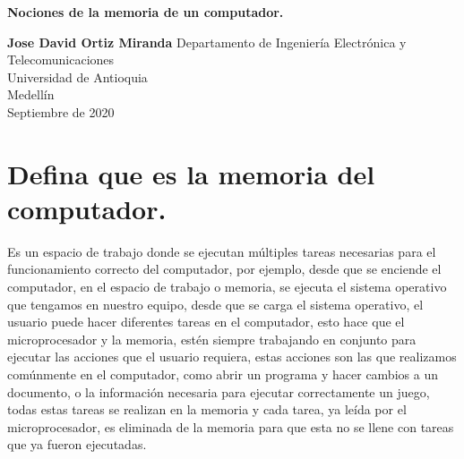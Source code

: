 \documentclass{article}
\begin{document}
\begin{titlepage}
    \begin{center}
        \vspace*{1cm}
            
        \Huge
        \textbf{Nociones de la memoria de un computador.}
            
        \vspace{0.5cm}
        \LARGE
        \textbf{Jose David Ortiz Miranda}
        \vfill
        \vspace{0.8cm}
        \Large
        Departamento de Ingeniería Electrónica y Telecomunicaciones\\
        Universidad de Antioquia\\
        Medellín\\
        Septiembre de 2020
            
    \end{center}
\end{titlepage}

\section{Defina que es la memoria del computador.} \label{contenido}
        \Large
        Es un espacio de trabajo donde se ejecutan múltiples tareas necesarias para el funcionamiento correcto del computador, por ejemplo, desde que se enciende el computador, en el espacio de trabajo o memoria, se ejecuta el sistema operativo que tengamos en nuestro equipo, desde que se carga el sistema operativo, el usuario puede hacer diferentes tareas en el computador, esto hace que el microprocesador y la memoria, estén siempre trabajando en conjunto para ejecutar las acciones que el usuario requiera, estas acciones son las que realizamos comúnmente en el computador, como abrir un programa y hacer cambios a un documento, o la información necesaria para ejecutar correctamente un juego, todas estas tareas se realizan en la memoria y cada tarea, ya leída por el microprocesador, es eliminada de la memoria para que esta no se llene con tareas que ya fueron ejecutadas.
        
\end{document}
